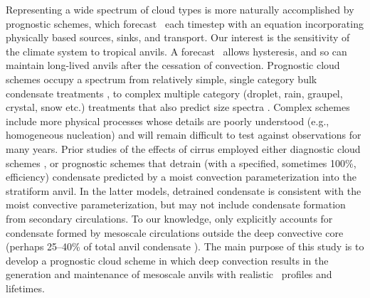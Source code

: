 \documentclass[twoside,agums]{aguplus}
\begin{document}
Representing a wide spectrum of cloud types is more naturally
accomplished by prognostic schemes, which forecast \qc\ each timestep 
with an equation incorporating physically based sources, sinks, and
transport. 
Our interest is the sensitivity of the climate system to tropical
anvils.
A forecast \qc\ allows hysteresis, and so can maintain long-lived
anvils after the cessation of convection.
Prognostic cloud schemes occupy a spectrum from relatively simple,
single category bulk condensate treatments \cite[e.g.,][]{Sun88}, to
complex multiple category (droplet, rain, graupel, crystal, snow etc.) 
treatments that also predict size spectra \cite[e.g.,][]{FTV89}.
Complex schemes include more physical processes whose details are
poorly understood (e.g., homogeneous nucleation) and will remain
difficult to test against observations for many years.
Prior studies of the effects of cirrus employed either diagnostic
cloud schemes \cite[e.g.,][]{SlS88,RHD89}, or prognostic schemes
\cite[e.g.,][]{SeM93,SRB94,FoR962,DYK96} that detrain (with a
specified, sometimes 100\%, efficiency) condensate predicted by a
moist convection parameterization into the stratiform anvil.
In the latter models, detrained condensate is consistent with the
moist convective parameterization, but may not include condensate
formation from secondary circulations. 
To our knowledge, only \cite{Don93} explicitly accounts for condensate
formed by mesoscale circulations outside the deep convective core
(perhaps 25--40\% of total anvil condensate \cite[]{LeH80,GaH83}).  
The main purpose of this study is to develop a prognostic cloud scheme
in which deep convection results in the generation and maintenance of
mesoscale anvils with realistic \qc\ profiles and lifetimes.
\end{document}
